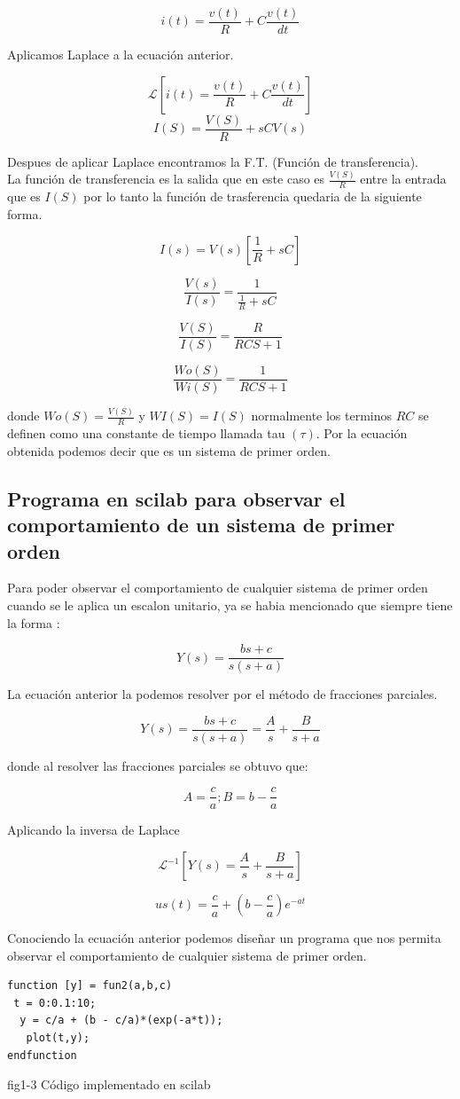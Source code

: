 \documentclass[12pt,a4paper]{IEEEtran}
\begin{document}
$$i(t) = \frac{v(t)}{R} + C\frac{v(t)}{dt} $$

Aplicamos Laplace a la ecuación anterior.

$$\mathcal{L}[i(t) = \frac{v(t)}{R} + C\frac{v(t)}{dt}]$$
$$I(S) = \frac{V(S)}{R} + sCV(s) $$

Despues de aplicar Laplace encontramos la F.T. (Función de transferencia).\\
La función de transferencia es la salida que en este caso es $\frac{V(S)}{R}$ entre la entrada que es $I(S)$ por lo tanto la función de trasferencia quedaria de la siguiente forma.

$$I(s) = V(s)[\frac{1}{R}+ sC]$$

$$\frac{V(s)}{I(s)} = \frac{1}{\frac{1}{R} + sC}$$

$$\frac{V(S)}{I(S)} = \frac{R}{RCS + 1}$$

$$\frac{Wo(S)}{Wi(S)} = \frac{1}{RCS + 1}$$

donde $Wo(S) = \frac{V(S)}{R}$ y $WI(S) = I(S)$ normalmente los terminos $RC$ se definen como una constante de tiempo llamada tau $(\tau)$. Por la ecuación obtenida podemos decir que es un sistema de primer orden.
\subsection{Programa en scilab para observar el comportamiento de un sistema de primer orden}

Para poder observar el comportamiento de cualquier sistema de primer orden cuando se le aplica un escalon unitario, ya se habia mencionado que siempre tiene la forma : 

$$Y(s) = \frac{bs + c}{s(s + a)}$$

La ecuación anterior la podemos resolver por el método de fracciones parciales.

$$Y(s) = \frac{bs + c}{s(s + a)} = \frac{A}{s} + \frac{B}{s + a}$$

donde al resolver las fracciones parciales se obtuvo que:

$$A = \frac{c}{a} ; B = b - \frac{c}{a}$$

Aplicando la inversa de Laplace

$$\mathcal{L}^{-1}[Y(s) = \frac{A}{s} + \frac{B}{s + a}]$$

$$us(t) = \frac{c}{a} + (b - \frac{c}{a})e^{-at}  $$

Conociendo la ecuación anterior podemos diseñar un programa que nos permita observar el comportamiento de cualquier sistema de primer orden. 
\begin{center}
\begin{verbatim}
function [y] = fun2(a,b,c)
 t = 0:0.1:10;
  y = c/a + (b - c/a)*(exp(-a*t));
   plot(t,y);
endfunction
\end{verbatim}
fig1-3 Código implementado en scilab \cite{Mora}
\end{center} 
\end{document}
